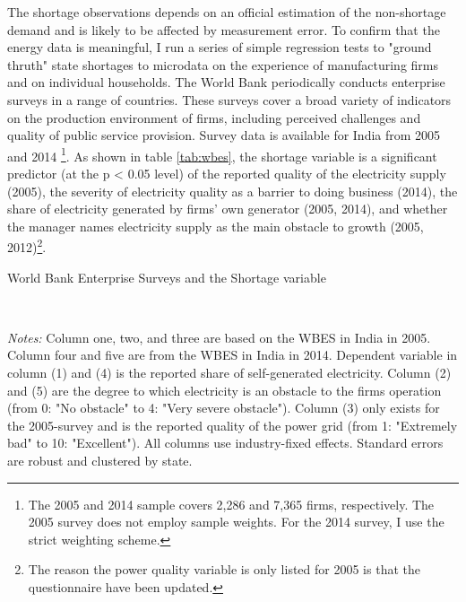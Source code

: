 \documentclass[11pt]{article}
\begin{document}
The shortage observations depends on an official estimation of the non-shortage demand and is likely to be affected by measurement error. To confirm that the energy data is meaningful, I run a series of simple regression tests to "ground thruth" state shortages to microdata on the experience of manufacturing firms and on individual households. 
The World Bank periodically conducts enterprise surveys in a range of countries. These surveys cover a broad variety of indicators on the production environment of firms, including perceived challenges and quality of public service provision. Survey data is available for India from 2005 and 2014 \citep{world_bank_enterprise_2020-1,world_bank_enterprise_2020-2}\footnote{The 2005 and 2014 sample covers 2,286 and 7,365 firms, respectively. The 2005 survey does not employ sample weights. For the 2014 survey, I use the strict weighting scheme.}. As shown in table \ref{tab:wbes}, the shortage variable is a significant predictor (at the p < 0.05 level) of the reported quality of the electricity supply (2005), the severity of electricity quality as a barrier to doing business (2014), the share of electricity generated by firms' own generator (2005, 2014), and whether the manager names electricity supply as the main obstacle to growth (2005, 2012)\footnote{The reason the power quality variable is only listed for 2005 is that the questionnaire have been updated.}.

\begin{table}
    \caption{World Bank Enterprise Surveys and the Shortage variable}
    \label{tab:wbes}
    \begin{minipage}{0.95\textwidth} 

    \\
    { \footnotesize \textit{Notes:} Column one, two, and three are based on the WBES in India in 2005. Column four and five are from the WBES in India in 2014. Dependent variable in column (1) and (4) is the reported share of self-generated electricity. Column (2) and (5) are the degree to which electricity is an obstacle to the firms operation (from 0: "No obstacle" to 4: "Very severe obstacle"). Column (3) only exists for the 2005-survey and is the reported quality of the power grid (from 1: "Extremely bad" to 10: "Excellent"). All columns use industry-fixed effects. Standard errors are robust and clustered by state. \\
\par}
    \end{minipage}
\end{table}   
\end{document}
